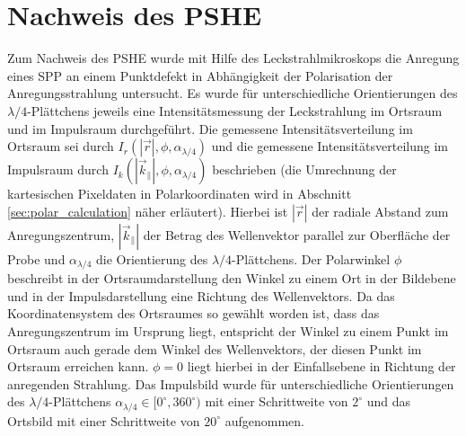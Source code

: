 \documentclass[a4paper, titlepage,  ngerman]{book}
\begin{document}
	\section{Nachweis des PSHE}
	Zum Nachweis des PSHE wurde mit Hilfe des Leckstrahlmikroskops die Anregung eines SPP an einem Punktdefekt in Abhängigkeit der Polarisation der Anregungsstrahlung untersucht. Es wurde für unterschiedliche Orientierungen des $\lambda /4$-Plättchens jeweils eine Intensitätsmessung der Leckstrahlung im Ortsraum und im Impulsraum durchgeführt. Die gemessene Intensitätsverteilung im Ortsraum sei durch $I_r(|\vec{r}|, \phi, \alpha_{\lambda /4})$ und die gemessene Intensitätsverteilung im Impulsraum durch $I_k(|\vec{k}_\parallel|, \phi, \alpha_{\lambda /4})$ beschrieben (die Umrechnung der kartesischen Pixeldaten in Polarkoordinaten wird in Abschnitt \ref{sec:polar_calculation} näher erläutert). Hierbei ist $|\vec{r}|$ der radiale Abstand zum Anregungszentrum, $|\vec{k}_\parallel|$ der Betrag des Wellenvektor parallel zur Oberfläche der Probe und $\alpha_{\lambda/4}$ die Orientierung des $\lambda/4$-Plättchens. Der Polarwinkel $\phi$ beschreibt in der Ortsraumdarstellung den Winkel zu einem Ort in der Bildebene und in der Impulsdarstellung eine Richtung des Wellenvektors. Da das Koordinatensystem des Ortsraumes so gewählt worden ist, dass das Anregungszentrum im Ursprung liegt, entspricht der Winkel zu einem Punkt im Ortsraum auch gerade dem Winkel des Wellenvektors, der diesen Punkt im Ortsraum erreichen kann. $\phi = 0$ liegt hierbei in der Einfallsebene in Richtung der anregenden Strahlung. Das Impulsbild wurde für unterschiedliche Orientierungen des $\lambda/4$-Plättchens  $\alpha_{\lambda/4} \in [0^\circ,360^\circ)$ mit einer Schrittweite von $2^\circ$ und das Ortsbild mit einer Schrittweite von $20^\circ$ aufgenommen.
	
\end{document}
